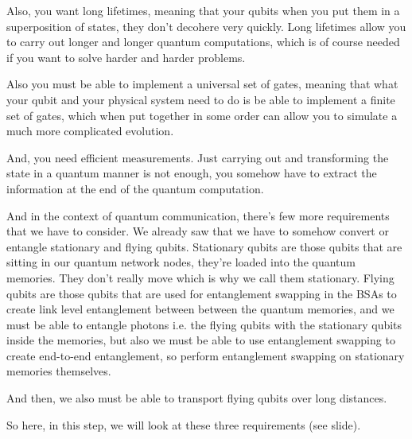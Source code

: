 Also, you want long lifetimes, meaning that your qubits when you put them in a superposition of states, they don't decohere very quickly. Long lifetimes allow you to carry out longer and longer quantum computations, which is of course needed if you want to solve harder and harder problems.

Also you must be able to implement a universal set of gates, meaning that what your qubit and your physical system need to do is be able to implement a finite set of gates, which when put together in some order can allow you to simulate a much more complicated evolution.

And, you need efficient measurements. Just carrying out and transforming the state in a quantum manner is not enough, you somehow have to extract the information at the end of the quantum computation.

And in the context of quantum communication, there's few more requirements that we have to consider. We already saw that we have to somehow convert or entangle stationary and flying qubits. Stationary qubits are those qubits that are sitting in our quantum network nodes, they're loaded into the quantum memories. They don't really move which is why we call them stationary. Flying qubits are those qubits that are used for entanglement swapping in the BSAs to create link level entanglement between between the quantum memories, and we must be able to entangle photons i.e. the flying qubits with the stationary qubits inside the memories, but also we must be able to use entanglement swapping to create end-to-end entanglement, so perform entanglement swapping on stationary memories themselves.

And then, we also must be able to transport flying qubits over long distances.

So here, in this step, we will look at these three requirements (see slide).

